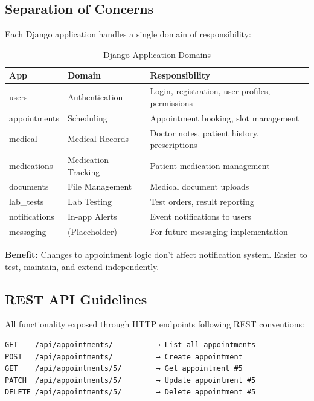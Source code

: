 \documentclass[11pt,a4paper,twoside]{report}
\begin{document}
\subsection{Separation of Concerns}

Each Django application handles a single domain of responsibility:

\begin{table}[H]
\centering
\begin{tabular}{|l|l|p{5cm}|}
\hline
\textbf{App} & \textbf{Domain} & \textbf{Responsibility} \\
\hline
users & Authentication & Login, registration, user profiles, permissions \\
\hline
appointments & Scheduling & Appointment booking, slot management \\
\hline
medical & Medical Records & Doctor notes, patient history, prescriptions \\
\hline
medications & Medication Tracking & Patient medication management \\
\hline
documents & File Management & Medical document uploads \\
\hline
lab\_tests & Lab Testing & Test orders, result reporting \\
\hline
notifications & In-app Alerts & Event notifications to users \\
\hline
messaging & (Placeholder) & For future messaging implementation \\
\hline
\end{tabular}
\caption{Django Application Domains}
\end{table}

\textbf{Benefit:} Changes to appointment logic don't affect notification system. Easier to test, maintain, and extend independently.

\subsection{REST API Guidelines}

All functionality exposed through HTTP endpoints following REST conventions:

\begin{lstlisting}
GET    /api/appointments/          → List all appointments
POST   /api/appointments/          → Create appointment
GET    /api/appointments/5/        → Get appointment #5
PATCH  /api/appointments/5/        → Update appointment #5
DELETE /api/appointments/5/        → Delete appointment #5
\end{lstlisting}
\end{document}
